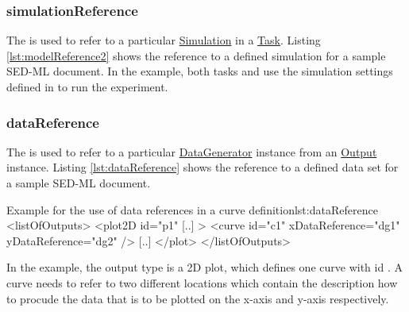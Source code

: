 \subsubsection{simulationReference}
\label{sec:simulationReference}
The  is used to refer to a particular \hyperref[class:simulation]{Simulation} in a \hyperref[class:task]{Task}. 
Listing \ref{lst:modelReference2} shows the reference to a defined simulation for a sample SED-ML document. In the example, both tasks  and  use the simulation settings defined in  to run the experiment.

\subsubsection{dataReference}
\label{sec:dataReference}
The  is used to refer to a particular \hyperref[class:dataGenerator]{DataGenerator} instance from an \hyperref[class:output]{Output} instance. 
Listing \ref{lst:dataReference} shows the reference to a defined data set for a sample SED-ML document. 
%
\begin{myXmlLst}{Example for the use of data references in a curve definition}{lst:dataReference}
<listOfOutputs>
  <plot2D id="p1" [..] >
    <curve id="c1" xDataReference="dg1" yDataReference="dg2" />
    [..]
  </plot>
</listOfOutputs>
\end{myXmlLst}
%
In the example, the output type is a 2D plot, which defines one curve with id . A curve needs to refer to two different locations which contain the description how to procude the data that is to be plotted on the x-axis and y-axis respectively. 


